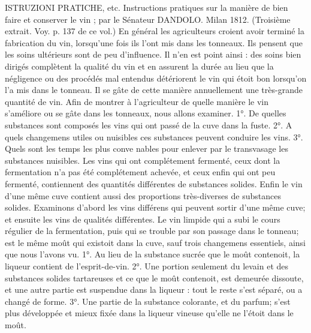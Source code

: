 \setcounter{page}{315} ISTRUZIONI PRATICHE, etc. Instructions pratiques sur la manière de bien faire et conserver le vin ; par le Sénateur DANDOLO. Milan 1812.
(Troisième extrait. Voy. p. 137 de ce vol.)
En général les agriculteurs croient avoir terminé la fabrication du vin, lorsqu'une fois ils l'ont mis dans les tonneaux. Ils pensent que les soins ultérieurs sont de peu d'influence. Il n'en est point ainsi : des soins bien dirigés complètent la qualité du vin et en assurent la durée au lieu que la négligence ou des procédés mal entendus détériorent le vin qui étoit bon lorsqu'on l'a mis dans le tonneau. Il se gâte de cette manière annuellement une très-grande quantité de vin.
Afin de montrer à l'agriculteur de quelle manière le vin s'améliore ou se gâte dans les tonneaux, nous allons examiner.
1°. De quelles substances sont composés les vins qui ont passé de la cuve dans la fuste.
2°. A quels changemens utiles ou nuisibles ces substances peuvent conduire les vins.
3°. Quels sont les temps les plus conve\setcounter{page}{316} nables pour enlever par le transvasage les substances nuisibles.
Les vins qui ont complétement fermenté, ceux dont la fermentation n'a pas été complétement achevée, et ceux enfin qui ont peu fermenté, contiennent des quantités différentes de substances solides. Enfin le vin d'une même cuve contient aussi des proportions très-diverses de substances solides. Examinons d'abord les vins différens qui peuvent sortir d'une même cuve; et ensuite les vins de qualités différentes.
Le vin limpide qui a subi le cours régulier de la fermentation, puis qui se trouble par son passage dans le tonneau; est le même moût qui existoit dans la cuve, sauf trois changemens essentiels, ainsi que nous l'avons vu. 1°. Au lieu de la substance sucrée que le moût contenoit, la liqueur contient de l'esprit-de-vin. 2°. Une portion seulement du levain et des substances solides tartareuses et ce que le moût contenoit, est demeurée dissoute, et une autre partie est suspendue dans la liqueur : tout le reste s'est séparé, ou a changé de forme. 3°. Une partie de la substance colorante, et du parfum; s'est plus développée et mieux fixée dans la liqueur vineuse qu'elle ne l'étoit dans le moût.
